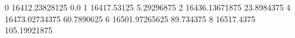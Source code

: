 0 16412.23828125 0.0
1 16417.53125 5.29296875
2 16436.13671875 23.8984375
4 16473.02734375 60.7890625
6 16501.97265625 89.734375
8 16517.4375 105.19921875
